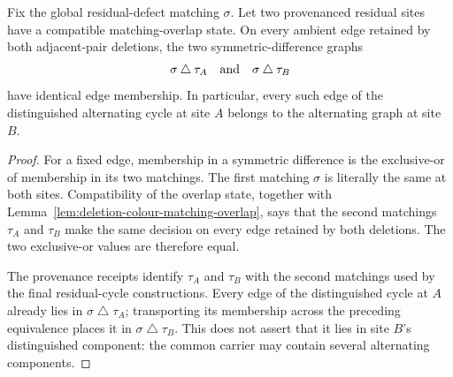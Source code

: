 \begin{lemma}
\label{lem:compatible-overlap-alternating-geometry}
Fix the global residual-defect matching $\sigma$.  Let two provenanced
residual sites have a compatible matching-overlap state.  On every ambient
edge retained by both adjacent-pair deletions, the two symmetric-difference
graphs
\[
        \sigma\mathbin{\triangle}\tau_A
        \quad\hbox{and}\quad
        \sigma\mathbin{\triangle}\tau_B
\]
have identical edge membership.  In particular, every such edge of the
distinguished alternating cycle at site $A$ belongs to the alternating graph
at site $B$.
\end{lemma}

\begin{proof}
For a fixed edge, membership in a symmetric difference is the exclusive-or
of membership in its two matchings.  The first matching $\sigma$ is literally
the same at both sites.  Compatibility of the overlap state, together with
Lemma~\ref{lem:deletion-colour-matching-overlap}, says that the second
matchings $\tau_A$ and $\tau_B$ make the same decision on every edge retained
by both deletions.  The two exclusive-or values are therefore equal.

The provenance receipts identify $\tau_A$ and $\tau_B$ with the second
matchings used by the final residual-cycle constructions.  Every edge of the
distinguished cycle at $A$ already lies in
$\sigma\mathbin{\triangle}\tau_A$; transporting its membership across the
preceding equivalence places it in
$\sigma\mathbin{\triangle}\tau_B$.  This does not assert that it lies in
site $B$'s distinguished component: the common carrier may contain several
alternating components.
\end{proof}

